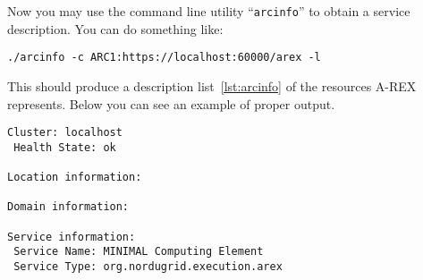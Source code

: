 \documentclass{article}                            %
\begin{document}
Now you may use the command line utility ``\texttt{arcinfo}'' to obtain a service
description. You can do something like:

\begin{lstlisting}
./arcinfo -c ARC1:https://localhost:60000/arex -l
\end{lstlisting}

This should produce a description list~\ref{lst:arcinfo} of the resources A-REX
represents. Below you can see an example of proper output.

\begin{lstlisting}[caption={Example of proper arcinfo output},label=lst:arcinfo]
Cluster: localhost
 Health State: ok

Location information:

Domain information:

Service information:
 Service Name: MINIMAL Computing Element
 Service Type: org.nordugrid.execution.arex


\end{lstlisting}
\end{document}
